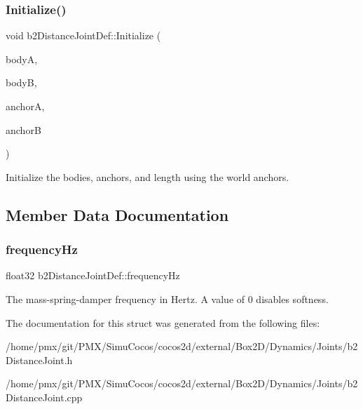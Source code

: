 \subsubsection{\texorpdfstring{Initialize()}{Initialize()}\hspace{0.1cm}{\footnotesize\ttfamily [2/2]}}
{\footnotesize\ttfamily void b2\+Distance\+Joint\+Def\+::\+Initialize (\begin{DoxyParamCaption}\item[{\hyperlink{classb2Body}{b2\+Body} $\ast$}]{bodyA,  }\item[{\hyperlink{classb2Body}{b2\+Body} $\ast$}]{bodyB,  }\item[{const \hyperlink{structb2Vec2}{b2\+Vec2} \&}]{anchorA,  }\item[{const \hyperlink{structb2Vec2}{b2\+Vec2} \&}]{anchorB }\end{DoxyParamCaption})}

Initialize the bodies, anchors, and length using the world anchors. 

\subsection{Member Data Documentation}
\mbox{\label{structb2DistanceJointDef_a35e2362bcb6c58734f95d0ac045863ea}} 
\subsubsection{\texorpdfstring{frequency\+Hz}{frequencyHz}}
{\footnotesize\ttfamily float32 b2\+Distance\+Joint\+Def\+::frequency\+Hz}

The mass-\/spring-\/damper frequency in Hertz. A value of 0 disables softness. 

The documentation for this struct was generated from the following files\+:\begin{DoxyCompactItemize}
\item 
/home/pmx/git/\+P\+M\+X/\+Simu\+Cocos/cocos2d/external/\+Box2\+D/\+Dynamics/\+Joints/b2\+Distance\+Joint.\+h\item 
/home/pmx/git/\+P\+M\+X/\+Simu\+Cocos/cocos2d/external/\+Box2\+D/\+Dynamics/\+Joints/b2\+Distance\+Joint.\+cpp\end{DoxyCompactItemize}
